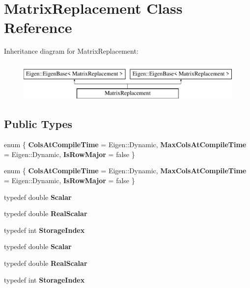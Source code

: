 \hypertarget{class_matrix_replacement}{}\section{Matrix\+Replacement Class Reference}
\label{class_matrix_replacement}
Inheritance diagram for Matrix\+Replacement\+:\begin{figure}[H]
\begin{center}
\leavevmode
\includegraphics[height=2.000000cm]{class_matrix_replacement}
\end{center}
\end{figure}
\subsection*{Public Types}
\begin{DoxyCompactItemize}
\item 
\mbox{\label{class_matrix_replacement_ad8c500d6aca73d5771145c59f1e5c2c9}} 
enum \{ {\bfseries Cols\+At\+Compile\+Time} = Eigen\+:\+:Dynamic, 
{\bfseries Max\+Cols\+At\+Compile\+Time} = Eigen\+:\+:Dynamic, 
{\bfseries Is\+Row\+Major} = false
 \}
\item 
\mbox{\label{class_matrix_replacement_a203a21c828c1cd6382fb5801a38816d3}} 
enum \{ {\bfseries Cols\+At\+Compile\+Time} = Eigen\+:\+:Dynamic, 
{\bfseries Max\+Cols\+At\+Compile\+Time} = Eigen\+:\+:Dynamic, 
{\bfseries Is\+Row\+Major} = false
 \}
\item 
\mbox{\label{class_matrix_replacement_aec775ba7fa545a05b1141cbea6d30f27}} 
typedef double {\bfseries Scalar}
\item 
\mbox{\label{class_matrix_replacement_ae4f64fa7e17b491d45316c29604c8c59}} 
typedef double {\bfseries Real\+Scalar}
\item 
\mbox{\label{class_matrix_replacement_a7e5fc118632e40c4752f405a4d8f9fa6}} 
typedef int {\bfseries Storage\+Index}
\item 
\mbox{\label{class_matrix_replacement_aec775ba7fa545a05b1141cbea6d30f27}} 
typedef double {\bfseries Scalar}
\item 
\mbox{\label{class_matrix_replacement_ae4f64fa7e17b491d45316c29604c8c59}} 
typedef double {\bfseries Real\+Scalar}
\item 
\mbox{\label{class_matrix_replacement_a7e5fc118632e40c4752f405a4d8f9fa6}} 
typedef int {\bfseries Storage\+Index}
\end{DoxyCompactItemize}
